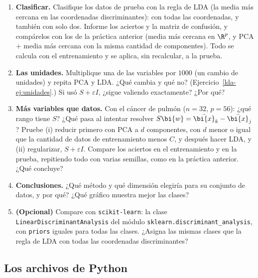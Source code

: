 \begin{enumerate}[leftmargin=*,label=\textbf{L.\arabic*},ref=L.\arabic*,itemsep=6pt]
\item \textbf{Clasificar.} Clasifique los datos de prueba con la regla de LDA
(la media más cercana en las coordenadas discriminantes): con todas las
coordenadas, y también con solo dos. Informe los aciertos y la matriz de
confusión, y compárelos con los de la práctica anterior (media más cercana en
$\R^p$, y PCA $+$ media más cercana con la misma cantidad de componentes).
Todo se calcula con el entrenamiento y se aplica, sin recalcular, a la prueba.

\item \textbf{Las unidades.} Multiplique una de las variables por $1000$ (un
cambio de unidades) y repita PCA y LDA. ¿Qué cambia y qué no?
(Ejercicio~\ref{lda-ej:unidades}.) Si usó $S+\varepsilon I$, ¿sigue
valiendo exactamente? ¿Por qué?

\item \textbf{Más variables que datos.} Con el cáncer de pulmón ($n=32$,
$p=56$): ¿qué rango tiene $S$? ¿Qué pasa al intentar resolver
$S\bi{w}=\bar{\bi{x}}_k-\bar{\bi{x}}_j$? Pruebe (i) reducir primero con PCA a $d$ componentes,
con $d$ menor o igual que la cantidad de datos de entrenamiento menos $C$, y
después hacer LDA, y (ii) regularizar, $S+\varepsilon I$. Compare los aciertos
en el entrenamiento y en la prueba, repitiendo todo con varias semillas, como
en la práctica anterior. ¿Qué concluye?

\item \textbf{Conclusiones.} ¿Qué método y qué dimensión elegiría para su
conjunto de datos, y por qué? ¿Qué gráfico muestra mejor las clases?

\item \textbf{(Opcional)} Compare con \texttt{scikit-learn}: la clase
\texttt{LinearDiscriminantAnalysis} del módulo
\texttt{sklearn.discriminant\_analysis}, con \texttt{priors} iguales para
todas las clases. ¿Asigna las mismas clases que la regla de LDA con todas las
coordenadas discriminantes?

\end{enumerate}

\subsection*{Los archivos de Python}

